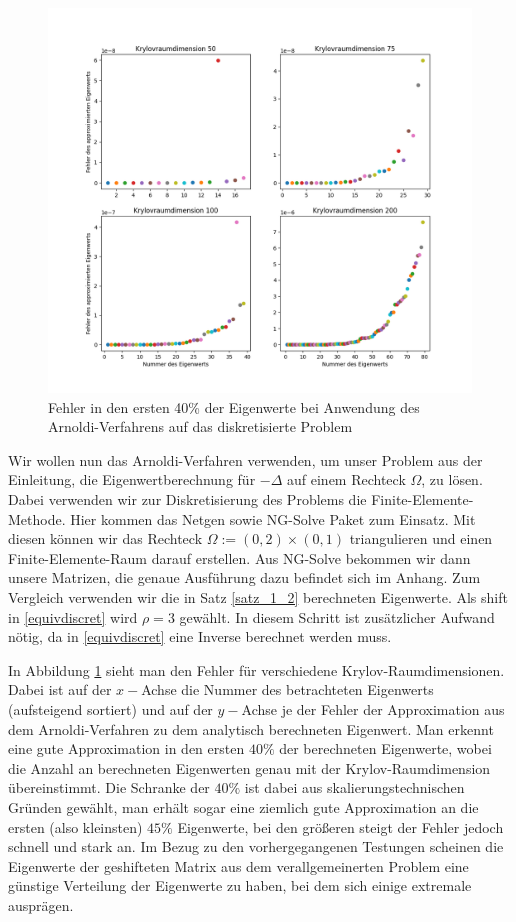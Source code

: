 \documentclass{article}
\theoremstyle{plain}
\begin{document}
\begin{figure}\label{error_eigv_laplace}
	\centering
	\includegraphics[width = 0.9\linewidth]{Plots/error_eigv_laplace}
	\caption{Fehler in den ersten 40\% der Eigenwerte bei Anwendung des Arnoldi-Verfahrens auf das diskretisierte Problem}
\end{figure}

Wir wollen nun das Arnoldi-Verfahren verwenden, um unser Problem aus der Einleitung, die Eigenwertberechnung für $-\Delta$ auf einem Rechteck $\Omega$, zu lösen. Dabei verwenden wir zur Diskretisierung des Problems die Finite-Elemente-Methode. Hier kommen das Netgen sowie NG-Solve Paket zum Einsatz. Mit diesen können wir das Rechteck $\Omega := (0,2) \times (0,1)$ triangulieren und einen Finite-Elemente-Raum darauf erstellen. Aus NG-Solve bekommen wir dann unsere Matrizen, die genaue Ausführung dazu befindet sich im Anhang. Zum Vergleich verwenden wir die in Satz \ref{satz_1_2} berechneten Eigenwerte. Als shift in \eqref{equivdiscret} wird $\rho = 3$ gewählt. In diesem Schritt ist zusätzlicher Aufwand nötig, da in \eqref{equivdiscret} eine Inverse berechnet werden muss.

 In Abbildung \ref{error_eigv_laplace} sieht man den Fehler für verschiedene Krylov-Raumdimensionen. Dabei ist auf der $x-$Achse die Nummer des betrachteten Eigenwerts (aufsteigend sortiert) und auf der $y-$Achse je der Fehler der Approximation aus dem Arnoldi-Verfahren zu dem analytisch berechneten Eigenwert.
 Man erkennt eine gute Approximation in den ersten $40\%$ der berechneten Eigenwerte, wobei die Anzahl an berechneten Eigenwerten genau mit der Krylov-Raumdimension übereinstimmt. Die Schranke der $40\%$ ist dabei aus skalierungstechnischen Gründen gewählt, man erhält sogar eine ziemlich gute Approximation an die ersten (also kleinsten) $45\%$ Eigenwerte, bei den größeren steigt der Fehler jedoch schnell und stark an. Im Bezug zu den vorhergegangenen Testungen scheinen die Eigenwerte der geshifteten Matrix aus dem verallgemeinerten Problem eine günstige Verteilung der Eigenwerte zu haben, bei dem sich einige extremale ausprägen.
\end{document}
